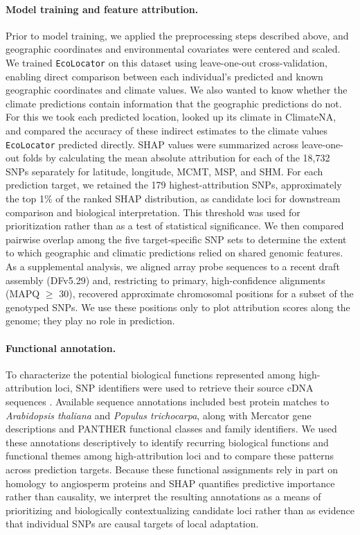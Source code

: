 \documentclass[]{article}
\newcommand{\ecolocator}{\texttt{EcoLocator}\xspace}
\begin{document}
\paragraph{Model training and feature attribution.}
Prior to model training,
we applied the preprocessing steps described above,
and geographic coordinates and environmental covariates
were centered and scaled.
We trained \ecolocator on this dataset
using leave-one-out cross-validation,
enabling direct comparison between
each individual's predicted and known
geographic coordinates and climate values.
We also wanted to know whether the climate predictions
contain information that the geographic predictions do not.
For this we took each predicted location, looked up its climate in ClimateNA,
and compared the accuracy of these indirect estimates
to the climate values \ecolocator predicted directly.
SHAP values were summarized across leave-one-out
folds by calculating the mean absolute attribution
for each of the 18,732 SNPs separately for latitude, longitude,
MCMT, MSP, and SHM. For each prediction target,
we retained the 179 highest-attribution SNPs,
approximately the top 1\% of the ranked SHAP distribution,
as candidate loci for downstream comparison and biological interpretation.
This threshold was used for prioritization rather than as a test of
statistical significance. We then compared pairwise overlap
among the five target-specific SNP sets to determine the extent
to which geographic and climatic predictions relied on shared genomic features.
As a supplemental analysis, we aligned array probe sequences to a recent
draft assembly (DFv5.29) and, restricting to primary,
high-confidence alignments (MAPQ $\geq$ 30), recovered approximate
chromosomal positions for a subset of the genotyped SNPs.
We use these positions only to plot attribution scores along the genome;
they play no role in prediction.

\paragraph{Functional annotation.}
To characterize the potential biological functions represented
among high-attribution loci, SNP identifiers were used to retrieve their source
cDNA sequences \citep{howe_axiom_2020}. Available sequence annotations included best protein matches
to \textit{Arabidopsis thaliana} and \textit{Populus trichocarpa},
along with Mercator gene descriptions and PANTHER functional classes and family
identifiers. We used these annotations descriptively to identify recurring biological
functions and functional themes among high-attribution loci and to compare these patterns
across prediction targets. Because these functional assignments rely in part on
homology to angiosperm proteins and SHAP quantifies predictive importance
rather than causality, we interpret the resulting annotations as a means of
prioritizing and biologically contextualizing candidate loci rather than as
evidence that individual SNPs are causal targets of local adaptation.
\end{document}
